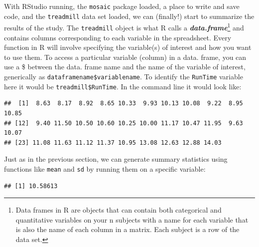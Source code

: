 \documentclass[]{book}
\newenvironment{Shaded}{\begin{snugshade}}{\end{snugshade}}
\newcommand{\KeywordTok}[1]{\textcolor[rgb]{0.13,0.29,0.53}{\textbf{#1}}}
\newcommand{\OperatorTok}[1]{\textcolor[rgb]{0.81,0.36,0.00}{\textbf{#1}}}
\newcommand{\NormalTok}[1]{#1}
\let\rmarkdownfootnote\footnote%
\def\footnote{\protect\rmarkdownfootnote}
\begin{document}
With RStudio running, the \texttt{mosaic} package loaded, a place to
write and save code, and the \texttt{treadmill} data set loaded, we can
(finally!) start to summarize the results of the study. The
\texttt{treadmill} object is what R calls a
\textbf{\emph{data.frame}}\footnote{Data frames in R are objects that
  can contain both categorical and quantitative variables on your n
  subjects with a name for each variable that is also the name of each
  column in a matrix. Each subject is a row of the data set.} and
contains columns corresponding to each variable in the spreadsheet.
Every function in R will involve specifying the variable(s) of interest
and how you want to use them. To access a particular variable (column)
in a data. frame, you can use a \$ between the data. frame name and the
name of the variable of interest, generically as
\texttt{dataframename\$variablename}. To identify the \texttt{RunTime}
variable here it would be \texttt{treadmill\$RunTime}. In the command
line it would look like:

\begin{Shaded}
\end{Shaded}

\begin{verbatim}
##  [1]  8.63  8.17  8.92  8.65 10.33  9.93 10.13 10.08  9.22  8.95 10.85
## [12]  9.40 11.50 10.50 10.60 10.25 10.00 11.17 10.47 11.95  9.63 10.07
## [23] 11.08 11.63 11.12 11.37 10.95 13.08 12.63 12.88 14.03
\end{verbatim}

Just as in the previous section, we can generate summary statistics
using functions like \texttt{mean} and \texttt{sd} by running them on a
specific variable:

\begin{Shaded}
\end{Shaded}

\begin{verbatim}
## [1] 10.58613
\end{verbatim}

\begin{Shaded}
\end{Shaded}
\end{document}
